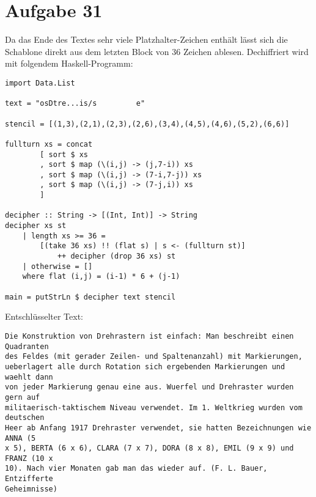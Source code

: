 \section*{Aufgabe 31}
Da das Ende des Textes sehr viele Platzhalter-Zeichen enthält lässt sich die
Schablone direkt aus dem letzten Block von $36$ Zeichen ablesen. Dechiffriert
wird mit folgendem Haskell-Programm:
\lstset{language=Haskell}
\begin{lstlisting}
import Data.List

text = "osDtre...is/s         e"

stencil = [(1,3),(2,1),(2,3),(2,6),(3,4),(4,5),(4,6),(5,2),(6,6)]

fullturn xs = concat
		[ sort $ xs
		, sort $ map (\(i,j) -> (j,7-i)) xs
		, sort $ map (\(i,j) -> (7-i,7-j)) xs
		, sort $ map (\(i,j) -> (7-j,i)) xs
		]

decipher :: String -> [(Int, Int)] -> String
decipher xs st
	| length xs >= 36 =
		[(take 36 xs) !! (flat s) | s <- (fullturn st)]
			++ decipher (drop 36 xs) st
	| otherwise = []
	where flat (i,j) = (i-1) * 6 + (j-1)

main = putStrLn $ decipher text stencil
\end{lstlisting}
Entschlüsselter Text:
\begin{verbatim}
Die Konstruktion von Drehrastern ist einfach: Man beschreibt einen Quadranten
des Feldes (mit gerader Zeilen- und Spaltenanzahl) mit Markierungen,
ueberlagert alle durch Rotation sich ergebenden Markierungen und waehlt dann
von jeder Markierung genau eine aus. Wuerfel und Drehraster wurden gern auf
militaerisch-taktischem Niveau verwendet. Im 1. Weltkrieg wurden vom deutschen
Heer ab Anfang 1917 Drehraster verwendet, sie hatten Bezeichnungen wie ANNA (5
x 5), BERTA (6 x 6), CLARA (7 x 7), DORA (8 x 8), EMIL (9 x 9) und FRANZ (10 x
10). Nach vier Monaten gab man das wieder auf. (F. L. Bauer, Entzifferte
Geheimnisse)
\end{verbatim}

